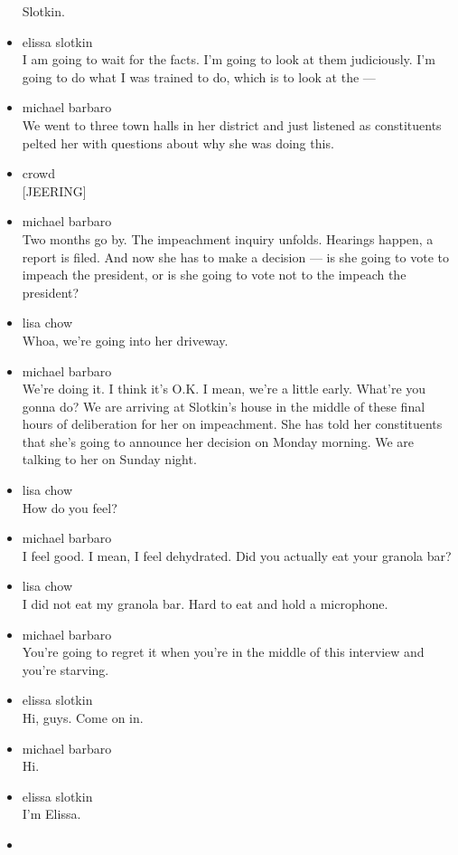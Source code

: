 \begin{itemize}
  Slotkin.
\item
  elissa slotkin\\
  I am going to wait for the facts. I'm going to look at them
  judiciously. I'm going to do what I was trained to do, which is to
  look at the ---
\item
  michael barbaro\\
  We went to three town halls in her district and just listened as
  constituents pelted her with questions about why she was doing this.
\item
  crowd\\
  {[}JEERING{]}
\item
  michael barbaro\\
  Two months go by. The impeachment inquiry unfolds. Hearings happen, a
  report is filed. And now she has to make a decision --- is she going
  to vote to impeach the president, or is she going to vote not to the
  impeach the president?
\item
  lisa chow\\
  Whoa, we're going into her driveway.
\item
  michael barbaro\\
  We're doing it. I think it's O.K. I mean, we're a little early.
  What're you gonna do? We are arriving at Slotkin's house in the middle
  of these final hours of deliberation for her on impeachment. She has
  told her constituents that she's going to announce her decision on
  Monday morning. We are talking to her on Sunday night.
\item
  lisa chow\\
  How do you feel?
\item
  michael barbaro\\
  I feel good. I mean, I feel dehydrated. Did you actually eat your
  granola bar?
\item
  lisa chow\\
  I did not eat my granola bar. Hard to eat and hold a microphone.
\item
  michael barbaro\\
  You're going to regret it when you're in the middle of this interview
  and you're starving.
\item
  elissa slotkin\\
  Hi, guys. Come on in.
\item
  michael barbaro\\
  Hi.
\item
  elissa slotkin\\
  I'm Elissa.
\item

\end{itemize}
